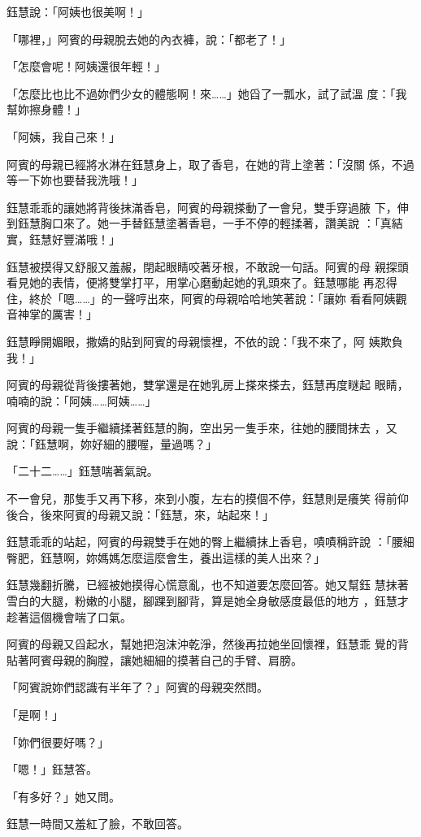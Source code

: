 鈺慧說：「阿姨也很美啊！」

「哪裡，」阿賓的母親脫去她的內衣褲，說：「都老了！」

「怎麼會呢！阿姨還很年輕！」

「怎麼比也比不過妳們少女的體態啊！來……」她舀了一瓢水，試了試溫
度：「我幫妳擦身體！」

「阿姨，我自己來！」

阿賓的母親已經將水淋在鈺慧身上，取了香皂，在她的背上塗著：「沒關
係，不過等一下妳也要替我洗哦！」

鈺慧乖乖的讓她將背後抹滿香皂，阿賓的母親搽動了一會兒，雙手穿過腋
下，伸到鈺慧胸口來了。她一手替鈺慧塗著香皂，一手不停的輕揉著，讚美說
：「真結實，鈺慧好豐滿哦！」

鈺慧被摸得又舒服又羞赧，閉起眼睛咬著牙根，不敢說一句話。阿賓的母
親探頭看見她的表情，便將雙掌打平，用掌心磨動起她的乳頭來了。鈺慧哪能
再忍得住，終於「嗯……」的一聲哼出來，阿賓的母親哈哈地笑著說：「讓妳
看看阿姨觀音神掌的厲害！」

鈺慧睜開媚眼，撒嬌的貼到阿賓的母親懷裡，不依的說：「我不來了，阿
姨欺負我！」

阿賓的母親從背後摟著她，雙掌還是在她乳房上搽來搽去，鈺慧再度瞇起
眼睛，喃喃的說：「阿姨……阿姨……」

阿賓的母親一隻手繼續揉著鈺慧的胸，空出另一隻手來，往她的腰間抹去
，又說：「鈺慧啊，妳好細的腰喔，量過嗎？」

「二十二……」鈺慧喘著氣說。

不一會兒，那隻手又再下移，來到小腹，左右的摸個不停，鈺慧則是癢笑
得前仰後合，後來阿賓的母親又說：「鈺慧，來，站起來！」

鈺慧乖乖的站起，阿賓的母親雙手在她的臀上繼續抹上香皂，嘖嘖稱許說
：「腰細臀肥，鈺慧啊，妳媽媽怎麼這麼會生，養出這樣的美人出來？」

鈺慧幾翻折騰，已經被她摸得心慌意亂，也不知道要怎麼回答。她又幫鈺
慧抹著雪白的大腿，粉嫩的小腿，腳踝到腳背，算是她全身敏感度最低的地方
，鈺慧才趁著這個機會喘了口氣。

阿賓的母親又舀起水，幫她把泡沫沖乾淨，然後再拉她坐回懷裡，鈺慧乖
覺的背貼著阿賓母親的胸膛，讓她細細的摸著自己的手臂、肩膀。

「阿賓說妳們認識有半年了？」阿賓的母親突然問。

「是啊！」

「妳們很要好嗎？」

「嗯！」鈺慧答。

「有多好？」她又問。

鈺慧一時間又羞紅了臉，不敢回答。

